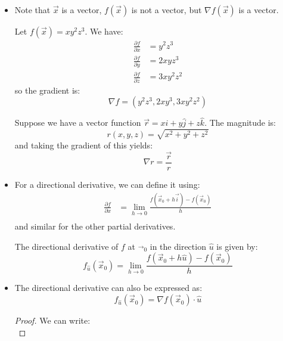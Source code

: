 \begin{itemize}
    \item Note that $\vec{x}$ is a vector, $f(\vec{x})$ is not a vector, but $\nabla f(\vec{x})$ is a vector.
    \begin{example}
        Let $f(\vec{x})=xy^2z^3$. We have:
        \begin{align}
            \frac{\partial f}{\partial x} &= y^2z^3 \\
            \frac{\partial f}{\partial y} &= 2xyz^3 \\ 
            \frac{\partial f}{\partial z} &= 3xy^2z^2
        \end{align}
        so the gradient is:
        \begin{equation}
            \nabla f = (y^2z^3, 2xy^3, 3xy^2z^2)
        \end{equation}
    \end{example}
    \begin{example}
        Suppose we have a vector function $\vec{r}=x\hat{i} + y\hat{j} + z\hat{k}$. The magnitude is: $$r(x,y,z)=\sqrt{x^2+y^2+z^2}$$ and taking the gradient of this yields:
        \begin{equation}
            \nabla r = \frac{\vec{r}}{r}
        \end{equation}
    \end{example}
    \item For a directional derivative, we can define it using:
    \begin{align}
        \frac{\partial f}{\partial x} &= \lim_{h\to 0}\frac{f(\vec{x}_0+h\vec{i})-f(\vec{x}_0)}{h} \\ 
    \end{align}
    and similar for the other partial derivatives.
    \begin{definition}
        The directional derivative of $f$ at $\vec{}_0$ in the direction $\hat{u}$ is given by:
        \begin{equation}
            f_{\hat{u}}(\vec{x}_0) = \lim_{h\to 0} \frac{f(\vec{x}_0+h\hat{u})-f(\vec{x}_0)}{h}
        \end{equation}
    \end{definition}
    \item The directional derivative can also be expressed as:
    \begin{equation}
        f_{\hat{u}}(\vec{x}_0) = \nabla f(\vec{x}_0)\cdot \hat{u}
    \end{equation}
    \begin{proof}
        We can write:
        \begin{equation}

\end{equation}
\end{proof}
\end{itemize}
